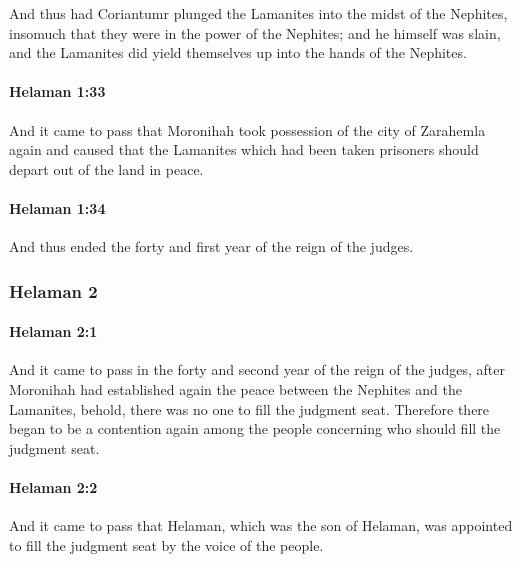 			And thus had Coriantumr plunged the Lamanites into the midst of the Nephites,
			insomuch that they were in the power of the Nephites;
			and he himself was slain,
			and the Lamanites did yield themselves up into the hands of the Nephites.

		\paragraph{Helaman 1:33} %
			\label{HELAMAN-1-33}

			And it came to pass that Moronihah took possession of the city of Zarahemla again
			and caused that the Lamanites which had been taken prisoners
			should depart out of the land in peace.

		\paragraph{Helaman 1:34} %
			\label{HELAMAN-1-34}

			And thus ended the forty and first year of the reign of the judges.

	\subsubsection{Helaman 2} %
		\label{HELAMAN-2}
		
		\paragraph{Helaman 2:1} %
			\label{HELAMAN-2-1}

			And it came to pass in the forty and second year of the reign of the judges,
			after Moronihah had established again the peace
			between the Nephites and the Lamanites,
			behold, there was no one to fill the judgment seat.
			Therefore there began to be a contention again among the people
			concerning who should fill the judgment seat.

		\paragraph{Helaman 2:2} %
			\label{HELAMAN-2-2}

			And it came to pass that Helaman, which was the son of Helaman,
			was appointed to fill the judgment seat by the voice of the people.

